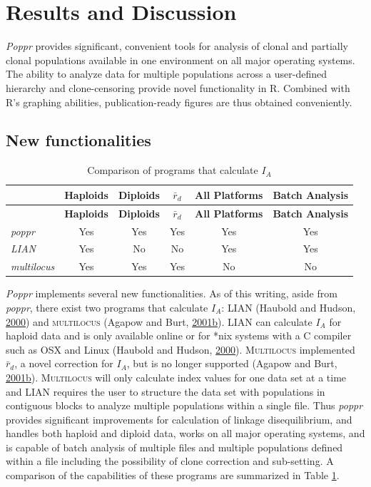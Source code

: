 \documentclass[double,12pt]{beavtex}
\begin{document}
  \section{Results and Discussion}\label{results-and-discussion}
  
  \emph{Poppr} provides significant, convenient tools for analysis of
  clonal and partially clonal populations available in one environment on
  all major operating systems. The ability to analyze data for multiple
  populations across a user-defined hierarchy and clone-censoring provide
  novel functionality in R. Combined with R's graphing abilities,
  publication-ready figures are thus obtained conveniently.
  
  \subsection{New functionalities}\label{new-functionalities}
  
  \begin{longtable}[]{@{}lccccc@{}}
  \caption{\label{tab:poppr5} Comparison of programs that calculate
  \(I_A\)}\tabularnewline
  \toprule
  & \textbf{Haploids} & \textbf{Diploids} & \(\bar{r}_d\) & \textbf{All
  Platforms} & \textbf{Batch Analysis}\tabularnewline
  \midrule
  \endfirsthead
  \toprule
  & \textbf{Haploids} & \textbf{Diploids} & \(\bar{r}_d\) & \textbf{All
  Platforms} & \textbf{Batch Analysis}\tabularnewline
  \midrule
  \endhead
  \emph{poppr} & Yes & Yes & Yes & Yes & Yes\tabularnewline
  \emph{LIAN} & Yes & No & No & Yes & Yes\tabularnewline
  \emph{multilocus} & Yes & Yes & Yes & No & No\tabularnewline
  \bottomrule
  \end{longtable}
  
  \emph{Poppr} implements several new functionalities. As of this writing,
  aside from \emph{poppr}, there exist two programs that calculate
  \(I_A\): \textsc{LIAN} (Haubold and Hudson,
  \protect\hyperlink{ref-Haubold:2000}{2000}) and \textsc{multilocus}
  (Agapow and Burt,
  \protect\hyperlink{ref-Agapow:2001}{2001}\protect\hyperlink{ref-Agapow:2001}{b}).
  \textsc{LIAN} can calculate \(I_A\) for haploid data and is only
  available online or for *nix systems with a C compiler such as OSX and
  Linux (Haubold and Hudson, \protect\hyperlink{ref-Haubold:2000}{2000}).
  \textsc{Multilocus} implemented \(\bar{r}_d\), a novel correction for
  \(I_A\), but is no longer supported (Agapow and Burt,
  \protect\hyperlink{ref-Agapow:2001}{2001}\protect\hyperlink{ref-Agapow:2001}{b}).
  \textsc{Multilocus} will only calculate index values for one data set at
  a time and \textsc{LIAN} requires the user to structure the data set
  with populations in contiguous blocks to analyze multiple populations
  within a single file. Thus \emph{poppr} provides significant
  improvements for calculation of linkage disequilibrium, and handles both
  haploid and diploid data, works on all major operating systems, and is
  capable of batch analysis of multiple files and multiple populations
  defined within a file including the possibility of clone correction and
  sub-setting. A comparison of the capabilities of these programs are
  summarized in Table \ref{tab:poppr5}.
  
\end{document}
